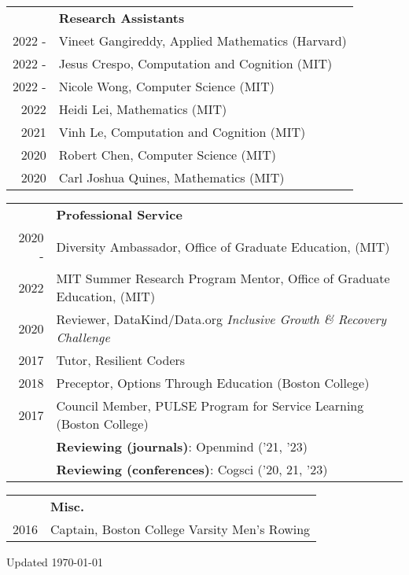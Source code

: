\documentclass[letterpaper, 11pt]{article}
\newcommand{\updateinfo}[1][\today]{\par\vfill\hfill{\scriptsize\color{gray}Updated #1}}
\newcommand{\headingfont}{\Large\color{Black}}
\newenvironment{SectionTableSingleSpace}[1]{
	\renewcommand*{\arraystretch}{1.2}
	\setlength{\tabcolsep}{10pt}
	\begin{longtable}{Rp{5.2in}} & #1 \\[0.6em]}
{\end{longtable}\vspace{-.3cm}}
\newenvironment{SectionTableHalfSpace}[1]{
	\renewcommand*{\arraystretch}{.9}
	\setlength{\tabcolsep}{10pt}
	\begin{longtable}{Rp{5.2in}} & #1 \\[0.3em]}
{\end{longtable}\vspace{-.3cm}}
\begin{document}
\begin{SectionTableHalfSpace}{\headingfont \textbf{Research Assistants}}
2022 - & Vineet Gangireddy, Applied Mathematics (Harvard)
\\
2022 - & Jesus Crespo, Computation and Cognition (MIT)
\\
2022 - & Nicole Wong, Computer Science (MIT)
\\
2022 & Heidi Lei, Mathematics (MIT)
\\
2021 & Vinh Le, Computation and Cognition (MIT)
\\
2020 & Robert Chen, Computer Science (MIT)
\\
2020 & Carl Joshua Quines, Mathematics (MIT)
\\
\end{SectionTableHalfSpace}

\begin{SectionTableSingleSpace}{\headingfont \textbf{Professional Service}}

2020 - & Diversity Ambassador, Office of Graduate Education, (MIT)\\
2022 & MIT Summer Research Program Mentor, Office of Graduate Education, (MIT)\\
2020 & Reviewer, DataKind/Data.org \newline
\textit{Inclusive Growth \& Recovery Challenge} \\
2017 & Tutor, Resilient Coders \\
2018 & Preceptor, Options Through Education (Boston College) \\
2017 & Council Member, PULSE Program for Service Learning (Boston College) \\
 & \textbf{Reviewing (journals)}: Openmind ('21, '23)\\
 & \textbf{Reviewing (conferences)}: Cogsci ('20, 21, '23) \\


\end{SectionTableSingleSpace}

\begin{SectionTableHalfSpace}{\headingfont \textbf{Misc.}}
2016 & Captain, Boston College Varsity Men's Rowing
\end{SectionTableHalfSpace}

\updateinfo
\end{document}

